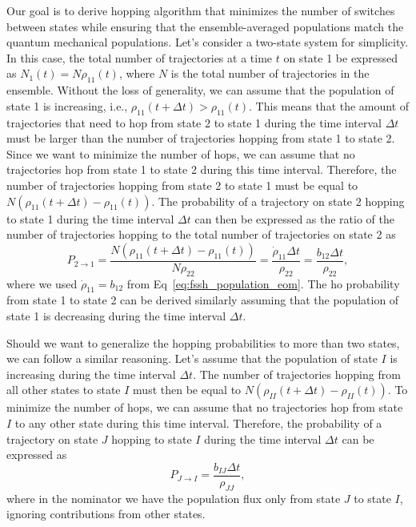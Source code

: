 Our goal is to derive hopping algorithm that minimizes the number of switches between states while ensuring that the ensemble-averaged populations match the quantum mechanical populations. Let's consider a two-state system for simplicity. In this case, the total number of trajectories at a time $t$ on state 1 be expressed as $N_1(t)=N\rho_{11}(t)$, where $N$ is the total number of trajectories in the ensemble. Without the loss of generality, we can assume that the population of state 1 is increasing, i.e., $\rho_{11}(t+\Delta t)>\rho_{11}(t)$. This means that the amount of trajectories that need to hop from state 2 to state 1 during the time interval $\Delta t$ must be larger than the number of trajectories hopping from state 1 to state 2. Since we want to minimize the number of hops, we can assume that no trajectories hop from state 1 to state 2 during this time interval. Therefore, the number of trajectories hopping from state 2 to state 1 must be equal to $N\left(\rho_{11}(t+\Delta t)-\rho_{11}(t)\right)$. The probability of a trajectory on state 2 hopping to state 1 during the time interval $\Delta t$ can then be expressed as the ratio of the number of trajectories hopping to the total number of trajectories on state 2 as
\begin{equation}\label{eq:fssh_hopping_probability_two_state}
    P_{2\to 1}=\frac{N\left(\rho_{11}(t+\Delta t)-\rho_{11}(t)\right)}{N\rho_{22}}=\frac{\dot\rho_{11}\Delta t}{\rho_{22}}=\frac{b_{12}\Delta t}{\rho_{22}},
\end{equation}
where we used $\dot\rho_{11}=b_{12}$ from Eq~\eqref{eq:fssh_population_eom}. The ho probability from state 1 to state 2 can be derived similarly assuming that the population of state 1 is decreasing during the time interval $\Delta t$.

Should we want to generalize the hopping probabilities to more than two states, we can follow a similar reasoning. Let's assume that the population of state $I$ is increasing during the time interval $\Delta t$. The number of trajectories hopping from all other states to state $I$ must then be equal to $N\left(\rho_{II}(t+\Delta t)-\rho_{II}(t)\right)$. To minimize the number of hops, we can assume that no trajectories hop from state $I$ to any other state during this time interval. Therefore, the probability of a trajectory on state $J$ hopping to state $I$ during the time interval $\Delta t$ can be expressed as
\begin{equation}\label{eq:fssh_hopping_probability_multistate}
P_{J\to I}=\frac{b_{IJ}\Delta t}{\rho_{JJ}},
\end{equation}
where in the nominator we have the population flux only from state $J$ to state $I$, ignoring contributions from other states.
